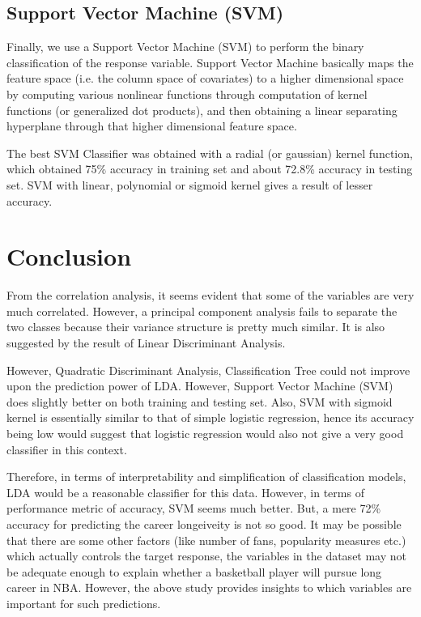\documentclass[10pt]{article}
\begin{document}
\subsection{Support Vector Machine (SVM)}

Finally, we use a Support Vector Machine (SVM) to perform the binary classification of the response variable. Support Vector Machine basically maps the feature space (i.e. the column space of covariates) to a higher dimensional space by computing various nonlinear functions through computation of kernel functions (or generalized dot products), and then obtaining a linear separating hyperplane through that higher dimensional feature space. 

The best SVM Classifier was obtained with a radial (or gaussian) kernel function, which obtained 75\% accuracy in training set and about 72.8\% accuracy in testing set. SVM with linear, polynomial or sigmoid kernel gives a result of lesser accuracy. 

\section{Conclusion}

From the correlation analysis, it seems evident that some of the variables are very much correlated. However, a principal component analysis fails to separate the two classes because their variance structure is pretty much similar. It is also suggested by the result of Linear Discriminant Analysis. 

However, Quadratic Discriminant Analysis, Classification Tree could not improve upon the prediction power of LDA. However, Support Vector Machine (SVM) does slightly better on both training and testing set. Also, SVM with sigmoid kernel is essentially similar to that of simple logistic regression, hence its accuracy being low would suggest that logistic regression would also not give a very good classifier in this context. 

Therefore, in terms of interpretability and simplification of classification models, LDA would be a reasonable classifier for this data. However, in terms of performance metric of accuracy, SVM seems much better. But, a mere 72\% accuracy for predicting the career longeiveity is not so good. It may be possible that there are some other factors (like number of fans, popularity measures etc.) which actually controls the target response, the variables in the dataset may not be adequate enough to explain whether a basketball player will pursue long career in NBA. However, the above study provides insights to which variables are important for such predictions.
\end{document}
